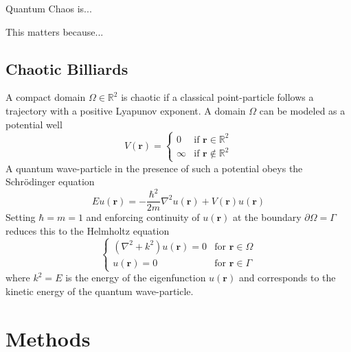 \documentclass{article}
\newcommand{\rr}[0]{\mathbf{r}}
\begin{document}
Quantum Chaos is...

This matters because...

\subsection*{Chaotic Billiards}
A compact domain $\Omega \in \mathbb{R}^{2}$ is chaotic if a classical point-particle follows a trajectory with a positive Lyapunov exponent. A domain $\Omega$ can be modeled as a potential well
\[
V(\rr) =\begin{cases}
0 & \text{if } \rr \in \mathbb{R}^{2}\\
\infty & \text{if } \rr \notin \mathbb{R}^{2}
\end{cases}
\]
A quantum wave-particle in the presence of such a potential obeys the Schrödinger equation
\[
E u(\rr) = - \frac{\hbar^{2}}{2m} \nabla^{2} u(\rr) + V(\rr) u(\rr)
\]
Setting $\hbar = m = 1$ and enforcing continuity of $u(\rr)$ at the boundary $\partial \Omega = \Gamma$ reduces this to the Helmholtz equation
\begin{equation}
\label{eq:helmholtz}
\begin{cases}
(\nabla^{2} + k^{2})u(\rr) = 0 & \text{for } \rr \in \Omega\\
  u(\rr) = 0 & \text{for } \rr \in \Gamma
\end{cases}
\end{equation}
where $k^{2} = E$ is the energy of the eigenfunction $u(\rr)$ and corresponds to the kinetic energy of the quantum wave-particle.

\section*{Methods}
\end{document}
